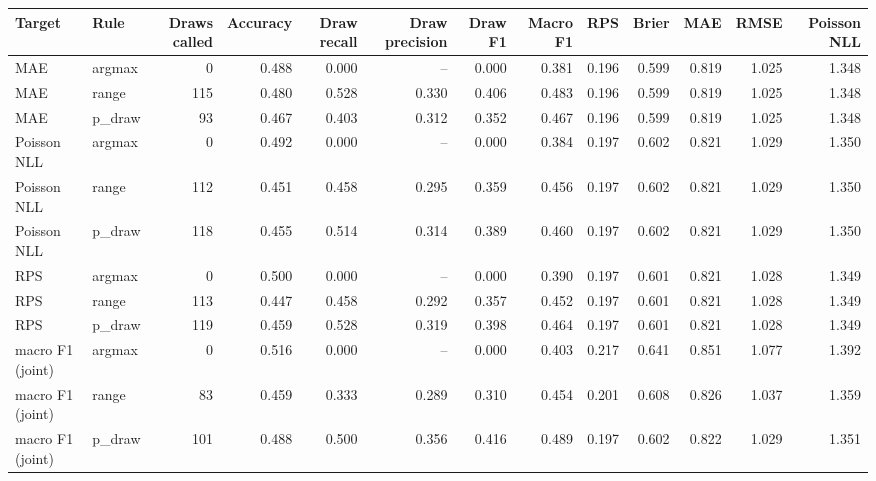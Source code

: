 
\begin{tabular}{llrrrrrrrrrrr}
\toprule
Target & Rule & Draws called & Accuracy & Draw recall & Draw precision & Draw F1 & Macro F1 & RPS & Brier & MAE & RMSE & Poisson NLL\\
\midrule
MAE & argmax & 0 & 0.488 & 0.000 & -- & 0.000 & 0.381 & 0.196 & 0.599 & 0.819 & 1.025 & 1.348\\
MAE & range & 115 & 0.480 & 0.528 & 0.330 & 0.406 & 0.483 & 0.196 & 0.599 & 0.819 & 1.025 & 1.348\\
MAE & p\_draw & 93 & 0.467 & 0.403 & 0.312 & 0.352 & 0.467 & 0.196 & 0.599 & 0.819 & 1.025 & 1.348\\
Poisson NLL & argmax & 0 & 0.492 & 0.000 & -- & 0.000 & 0.384 & 0.197 & 0.602 & 0.821 & 1.029 & 1.350\\
Poisson NLL & range & 112 & 0.451 & 0.458 & 0.295 & 0.359 & 0.456 & 0.197 & 0.602 & 0.821 & 1.029 & 1.350\\
Poisson NLL & p\_draw & 118 & 0.455 & 0.514 & 0.314 & 0.389 & 0.460 & 0.197 & 0.602 & 0.821 & 1.029 & 1.350\\
RPS & argmax & 0 & 0.500 & 0.000 & -- & 0.000 & 0.390 & 0.197 & 0.601 & 0.821 & 1.028 & 1.349\\
RPS & range & 113 & 0.447 & 0.458 & 0.292 & 0.357 & 0.452 & 0.197 & 0.601 & 0.821 & 1.028 & 1.349\\
RPS & p\_draw & 119 & 0.459 & 0.528 & 0.319 & 0.398 & 0.464 & 0.197 & 0.601 & 0.821 & 1.028 & 1.349\\
macro F1 (joint) & argmax & 0 & 0.516 & 0.000 & -- & 0.000 & 0.403 & 0.217 & 0.641 & 0.851 & 1.077 & 1.392\\
macro F1 (joint) & range & 83 & 0.459 & 0.333 & 0.289 & 0.310 & 0.454 & 0.201 & 0.608 & 0.826 & 1.037 & 1.359\\
macro F1 (joint) & p\_draw & 101 & 0.488 & 0.500 & 0.356 & 0.416 & 0.489 & 0.197 & 0.602 & 0.822 & 1.029 & 1.351\\
\bottomrule
\end{tabular}
